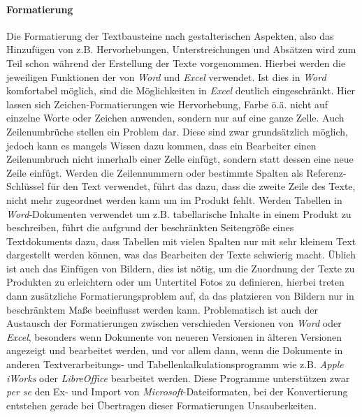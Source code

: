 \paragraph{Formatierung} Die Formatierung der Textbausteine nach gestalterischen Aspekten, also das Hinzufügen von z.B. Hervorhebungen, Unterstreichungen und Absätzen wird zum Teil schon während der Erstellung der Texte vorgenommen. Hierbei werden die jeweiligen Funktionen der von \emph{Word} und \emph{Excel} verwendet. Ist dies in \emph{Word} komfortabel möglich, sind die Möglichkeiten in \emph{Excel} deutlich eingeschränkt. Hier lassen sich Zeichen-Formatierungen wie Hervorhebung, Farbe ö.ä. nicht auf einzelne Worte oder Zeichen anwenden, sondern nur auf eine ganze Zelle. Auch Zeilenumbrüche stellen ein Problem dar. Diese sind zwar grundsätzlich möglich, jedoch kann es mangels Wissen dazu kommen, dass ein Bearbeiter einen Zeilenumbruch nicht innerhalb einer Zelle einfügt, sondern statt dessen eine neue Zeile einfügt. Werden die Zeilennummern oder bestimmte Spalten als Referenz-Schlüssel für den Text verwendet, führt das dazu, dass die zweite Zeile des Texte, nicht mehr zugeordnet werden kann um im Produkt fehlt. Werden Tabellen in \emph{Word}-Dokumenten verwendet um z.B. tabellarische Inhalte in einem Produkt zu beschreiben, führt die aufgrund der beschränkten Seitengröße eines Textdokuments dazu, dass Tabellen mit vielen Spalten nur mit sehr kleinem Text dargestellt werden können, was das Bearbeiten der Texte schwierig macht. Üblich ist auch das Einfügen von Bildern, dies ist nötig, um die Zuordnung der Texte zu Produkten zu erleichtern oder um Untertitel Fotos zu definieren, hierbei treten dann zusätzliche Formatierungsproblem auf, da das platzieren von Bildern nur in beschränktem Maße beeinflusst werden kann. Problematisch ist auch der Austausch der Formatierungen zwischen verschieden Versionen von \emph{Word} oder \emph{Excel}, besonders wenn Dokumente von neueren Versionen in älteren Versionen angezeigt und bearbeitet werden, und vor allem dann, wenn die Dokumente in anderen Textverarbeitungs- und Tabellenkalkulationsprogramm wie z.B. \emph{Apple} \emph{iWorks} oder \emph{LibreOffice} bearbeitet werden. Diese Programme unterstützen zwar \emph{per se} den Ex- und Import von \emph{Microsoft}-Dateiformaten, bei der Konvertierung entstehen gerade bei Übertragen dieser Formatierungen  Unsauberkeiten.

